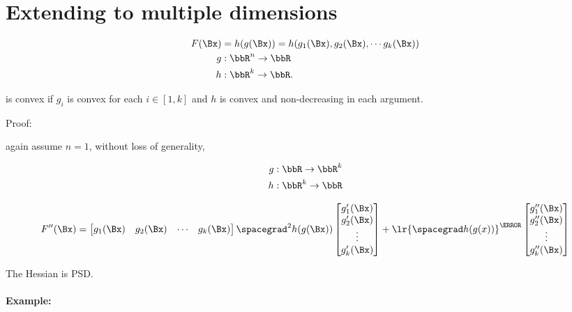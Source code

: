 \section{Extending to multiple dimensions}

\begin{dmath}\label{eqn:convexOptimizationLecture8:200}
\begin{aligned}
F(\Bx)
&= h(g(\Bx)) = h( g_1(\Bx), g_2(\Bx), \cdots g_k(\Bx) ) \\
g &: \bbR^n \rightarrow \bbR \\
h &: \bbR^k \rightarrow \bbR.
\end{aligned}
\end{dmath}

is convex if \( g_i \) is convex for each \( i \in [1,k] \) and \( h \) is convex and non-decreasing in each argument.

Proof:

again assume \( n = 1 \), without loss of generality,

\begin{dmath}\label{eqn:convexOptimizationLecture8:220}
\begin{aligned}
g &: \bbR \rightarrow \bbR^k \\
h &: \bbR^k \rightarrow \bbR \\
\end{aligned}
\end{dmath}

\begin{dmath}\label{eqn:convexOptimizationLecture8:240}
F''(\Bx)
=
\begin{bmatrix}
g_1(\Bx) & g_2(\Bx) & \cdots & g_k(\Bx)
\end{bmatrix}
\spacegrad^2 h(g(\Bx))
\begin{bmatrix}
g_1'(\Bx) \\ g_2'(\Bx) \\ \vdots \\ g_k'(\Bx)
\end{bmatrix}
+
\lr{ \spacegrad h(g(x)) }^\T
\begin{bmatrix}
g_1''(\Bx) \\ g_2''(\Bx) \\ \vdots \\ g_k''(\Bx)
\end{bmatrix}
\end{dmath}

The Hessian is PSD.

\paragraph{Example:}

